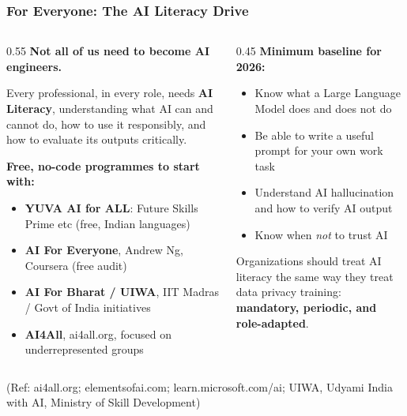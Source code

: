 \begin{frame}[fragile]\frametitle{For Everyone: The AI Literacy Drive}

\begin{columns}
    \begin{column}[T]{0.55\linewidth}
\textbf{Not all of us need to become AI engineers.}

\vspace{0.2cm}
Every professional, in every role, needs \textbf{AI Literacy}, understanding what AI can and cannot do, how to use it responsibly, and how to evaluate its outputs critically.

\vspace{0.2cm}
\textbf{Free, no-code programmes to start with:}
\begin{itemize}
\item \textbf{YUVA AI for ALL}: Future Skills Prime etc (free, Indian languages)
\item \textbf{AI For Everyone}, Andrew Ng, Coursera (free audit)
\item \textbf{AI For Bharat / UIWA}, IIT Madras / Govt of India initiatives
\item \textbf{AI4All}, ai4all.org, focused on underrepresented groups
\end{itemize}
    \end{column}
    \begin{column}[T]{0.45\linewidth}
\textbf{Minimum baseline for 2026:}

\begin{itemize}
\item Know what a Large Language Model does and does not do
\item Be able to write a useful prompt for your own work task
\item Understand AI hallucination and how to verify AI output
\item Know when \textit{not} to trust AI
\end{itemize}

\vspace{0.3cm}
{\small Organizations should treat AI literacy the same way they treat data privacy training: \textbf{mandatory, periodic, and role-adapted}.}
    \end{column}
\end{columns}

{\tiny (Ref: ai4all.org; elementsofai.com; learn.microsoft.com/ai; UIWA, Udyami India with AI, Ministry of Skill Development)}

\end{frame}
